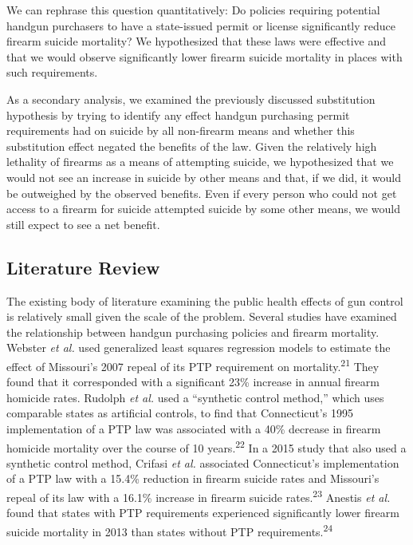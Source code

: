 \documentclass[]{article}
\begin{document}
We can rephrase this question quantitatively: Do policies requiring
potential handgun purchasers to have a state-issued permit or license
significantly reduce firearm suicide mortality? We hypothesized that
these laws were effective and that we would observe significantly lower
firearm suicide mortality in places with such requirements.

As a secondary analysis, we examined the previously discussed
substitution hypothesis by trying to identify any effect handgun
purchasing permit requirements had on suicide by all non-firearm means
and whether this substitution effect negated the benefits of the law.
Given the relatively high lethality of firearms as a means of attempting
suicide, we hypothesized that we would not see an increase in suicide by
other means and that, if we did, it would be outweighed by the observed
benefits. Even if every person who could not get access to a firearm for
suicide attempted suicide by some other means, we would still expect to
see a net benefit.

\subsection{Literature Review}\label{literature-review}

The existing body of literature examining the public health effects of
gun control is relatively small given the scale of the problem. Several
studies have examined the relationship between handgun purchasing
policies and firearm mortality. Webster \emph{et al.} used generalized
least squares regression models to estimate the effect of Missouri's
2007 repeal of its PTP requirement on mortality.\textsuperscript{21}
They found that it corresponded with a significant 23\% increase in
annual firearm homicide rates. Rudolph \emph{et al.} used a ``synthetic
control method,'' which uses comparable states as artificial controls,
to find that Connecticut's 1995 implementation of a PTP law was
associated with a 40\% decrease in firearm homicide mortality over the
course of 10 years.\textsuperscript{22} In a 2015 study that also used a
synthetic control method, Crifasi \emph{et al.} associated Connecticut's
implementation of a PTP law with a 15.4\% reduction in firearm suicide
rates and Missouri's repeal of its law with a 16.1\% increase in firearm
suicide rates.\textsuperscript{23} Anestis \emph{et al.} found that
states with PTP requirements experienced significantly lower firearm
suicide mortality in 2013 than states without PTP
requirements.\textsuperscript{24}
\end{document}
